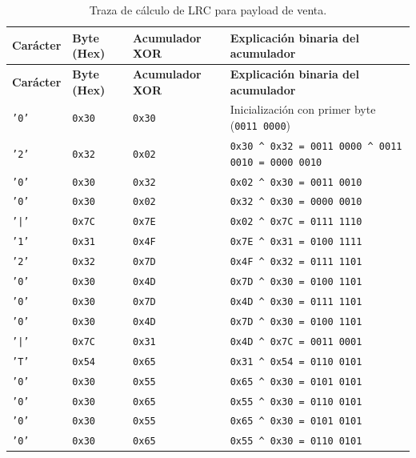 \documentclass{../../plantilla/raysac-informe}
\begin{document}
\begin{longtable}{@{}p{1.5cm}p{1.8cm}p{2.5cm}p{8.0cm}@{}}
\caption{Traza de cálculo de LRC para payload de venta.}\label{tab:traza-lrc}\\
\toprule
\textbf{Carácter} & \textbf{Byte (Hex)} & \textbf{Acumulador XOR} & \textbf{Explicación binaria del acumulador} \\
\midrule
\endfirsthead
\toprule
\textbf{Carácter} & \textbf{Byte (Hex)} & \textbf{Acumulador XOR} & \textbf{Explicación binaria del acumulador} \\
\midrule
\endhead
\bottomrule
\endlastfoot
\texttt{'0'} & \texttt{0x30} & \texttt{0x30} & Inicialización con primer byte (\texttt{0011 0000}) \\
\texttt{'2'} & \texttt{0x32} & \texttt{0x02} & \texttt{0x30 \^{} 0x32 = 0011 0000 \^{} 0011 0010 = 0000 0010} \\
\texttt{'0'} & \texttt{0x30} & \texttt{0x32} & \texttt{0x02 \^{} 0x30 = 0011 0010} \\
\texttt{'0'} & \texttt{0x30} & \texttt{0x02} & \texttt{0x32 \^{} 0x30 = 0000 0010} \\
\texttt{'|'} & \texttt{0x7C} & \texttt{0x7E} & \texttt{0x02 \^{} 0x7C = 0111 1110} \\
\texttt{'1'} & \texttt{0x31} & \texttt{0x4F} & \texttt{0x7E \^{} 0x31 = 0100 1111} \\
\texttt{'2'} & \texttt{0x32} & \texttt{0x7D} & \texttt{0x4F \^{} 0x32 = 0111 1101} \\
\texttt{'0'} & \texttt{0x30} & \texttt{0x4D} & \texttt{0x7D \^{} 0x30 = 0100 1101} \\
\texttt{'0'} & \texttt{0x30} & \texttt{0x7D} & \texttt{0x4D \^{} 0x30 = 0111 1101} \\
\texttt{'0'} & \texttt{0x30} & \texttt{0x4D} & \texttt{0x7D \^{} 0x30 = 0100 1101} \\
\texttt{'|'} & \texttt{0x7C} & \texttt{0x31} & \texttt{0x4D \^{} 0x7C = 0011 0001} \\
\texttt{'T'} & \texttt{0x54} & \texttt{0x65} & \texttt{0x31 \^{} 0x54 = 0110 0101} \\
\texttt{'0'} & \texttt{0x30} & \texttt{0x55} & \texttt{0x65 \^{} 0x30 = 0101 0101} \\
\texttt{'0'} & \texttt{0x30} & \texttt{0x65} & \texttt{0x55 \^{} 0x30 = 0110 0101} \\
\texttt{'0'} & \texttt{0x30} & \texttt{0x55} & \texttt{0x65 \^{} 0x30 = 0101 0101} \\
\texttt{'0'} & \texttt{0x30} & \texttt{0x65} & \texttt{0x55 \^{} 0x30 = 0110 0101} \\

\end{longtable}
\end{document}
